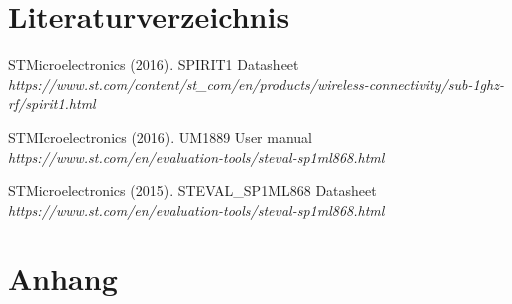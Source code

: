 \documentclass[a4paper, 12.5pt]{scrartcl}
\begin{document}
\newpage

\section{Literaturverzeichnis}
\begin{thebibliography}{1}

 STMicroelectronics (2016). SPIRIT1 Datasheet {\em https://www.st.com/content/st_com/en/products/wireless-connectivity/sub-1ghz-rf/spirit1.html}

STMIcroelectronics (2016). UM1889 User manual {\em https://www.st.com/en/evaluation-tools/steval-sp1ml868.html}

STMicroelectronics (2015). STEVAL_SP1ML868 Datasheet {\em https://www.st.com/en/evaluation-tools/steval-sp1ml868.html}

\end{thebibliography}

\section{Anhang}
\end{document}

